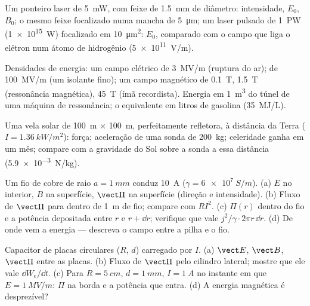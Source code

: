 \begin{exercise}[$\star$]\label{exo:b2:poynting-vector:2}
Um ponteiro laser de \qty{5}{mW}, com feixe de \qty{1.5}{mm} de diâmetro: intensidade, $E_0$,
$B_0$; o mesmo feixe focalizado numa mancha de \qty{5}{\micro m}; um laser pulsado de \qty{1}{PW}
(\qty{1e15}{W}) focalizado em \qty{10}{\micro m^2}: $E_0$, comparado
com o campo que liga o elétron num átomo de hidrogênio (\qty{5e11}{V/m}).
\end{exercise}

\begin{exercise}[$\star$]\label{exo:b2:poynting-vector:3}
Densidades de energia: um campo elétrico de \qty{3}{MV/m} (ruptura do ar);
de \qty{100}{MV/m} (um isolante fino); um campo magnético de \qty{0.1}{T},
\qty{1.5}{T} (ressonância magnética), \qty{45}{T} (ímã recordista). Energia em \qty{1}{m^3} do túnel
de uma máquina de ressonância; o equivalente em litros de gasolina (\qty{35}{MJ/L}).
\end{exercise}

\begin{exercise}[$\star$]\label{exo:b2:poynting-vector:4}
Uma vela solar de \qty{100}{m} $\times$ \qty{100}{m}, perfeitamente refletora, à
distância da Terra ($I = \qty{1.36}{kW/m^2}$): força; aceleração de uma
sonda de \qty{200}{kg}; celeridade ganha em um mês; compare com a
gravidade do Sol sobre a sonda a essa distância (\qty{5.9e-3}{N/kg}).
\end{exercise}

\begin{exercise}[$\star\star$]\label{exo:b2:poynting-vector:5}
Um fio de cobre de raio $a = \qty{1}{mm}$ conduz \qty{10}{A} ($\gamma =
\qty{6e7}{S/m}$). (a) $E$ no interior, $B$ na superfície, $\vect\Pi$ na
superfície (direção e intensidade). (b) Fluxo de $\vect\Pi$ para dentro de \qty{1}{m}
de fio; compare com $RI^2$. (c) $\Pi(r)$ dentro do fio e a potência
depositada entre $r$ e $r + \dd r$; verifique que vale $j^2/\gamma\cdot2\pi r\,\dd r$.
(d) De onde vem a energia --- descreva o campo entre
a pilha e o fio.
\end{exercise}

\begin{exercise}[$\star\star$]\label{exo:b2:poynting-vector:6}
Capacitor de placas circulares ($R$, $d$) carregado por $I$. (a) $\vect E$, $\vect B$,
$\vect\Pi$ entre as placas. (b) Fluxo de $\vect\Pi$ pelo cilindro
lateral; mostre que ele vale $\dd W_e/\dd t$. (c) Para $R = \qty{5}{cm}$, $d =
\qty{1}{mm}$, $I = \qty{1}{A}$ no instante em que $E = \qty{1}{MV/m}$: $\Pi$ na
borda e a potência que entra. (d) A energia magnética é desprezível?
\end{exercise}

